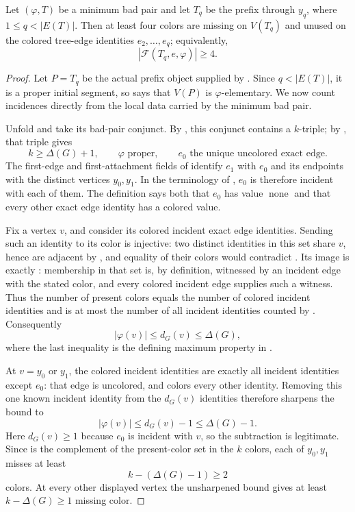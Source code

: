 \begin{lemma}
Let \((\varphi,T)\) be a minimum bad pair and let \(T_q\) be the prefix
through \(y_q\), where \(1\le q<|E(T)|\).  Then at least four colors are
missing on \(V(T_q)\) and unused on the colored tree-edge identities
\(e_2,\ldots,e_q\); equivalently,
\[
  |\mathcal F(T_q,e,\varphi)|\ge4.
\]
\end{lemma}
\begin{proof}
Let \(P=T_q\) be the actual prefix object supplied by
.  Since \(q<|E(T)|\), it is a proper initial
segment, so  says that \(V(P)\)
is \(\varphi\)-elementary.  We now count incidences directly from the
local data carried by the minimum bad pair.

Unfold  and take its bad-pair conjunct.
By , this conjunct contains a \(k\)-triple; by
, that triple gives
\[
 k\ge \Delta(G)+1,\qquad
 \text{\(\varphi\) proper},\qquad
 \text{\(e_0\) the unique uncolored exact edge.}
\]
The first-edge and first-attachment fields of 
identify \(e_1\) with \(e_0\) and its endpoints with the distinct vertices
\(y_0,y_1\).  In the terminology of , \(e_0\) is
therefore incident with each of them.  The definition
 says both that \(e_0\) has value
\(\operatorname{none}\) and that every other exact edge identity has a
colored value.

Fix a vertex \(v\), and consider its colored incident exact edge
identities.  Sending such an identity to its color is injective: two
distinct identities in this set share \(v\), hence are adjacent by
, and equality of their colors would contradict
.  Its image is exactly
: membership in that set is, by definition,
witnessed by an incident edge with the stated color, and every colored
incident edge supplies such a witness.  Thus the number of present colors
equals the number of colored incident identities and is at most the number
of all incident identities counted by .  Consequently
\[
  |\varphi(v)|\le d_G(v)\le\Delta(G),
\]
where the last inequality is the defining maximum property in
.

At \(v=y_0\) or \(y_1\), the colored incident identities are exactly all
incident identities except \(e_0\): that edge is uncolored, and
 colors every other identity.  Removing this
one known incident identity from the \(d_G(v)\) identities therefore
sharpens the bound to
\[
 |\varphi(v)|\le d_G(v)-1\le\Delta(G)-1.
\]
Here \(d_G(v)\ge1\) because \(e_0\) is incident with \(v\), so the
subtraction is legitimate.  Since  is the
complement of the present-color set in the \(k\) colors, each of
\(y_0,y_1\) misses at least
\[
 k-(\Delta(G)-1)\ge2
\]
colors.  At every other displayed vertex the unsharpened bound gives at
least \(k-\Delta(G)\ge1\) missing color.


\end{proof}
